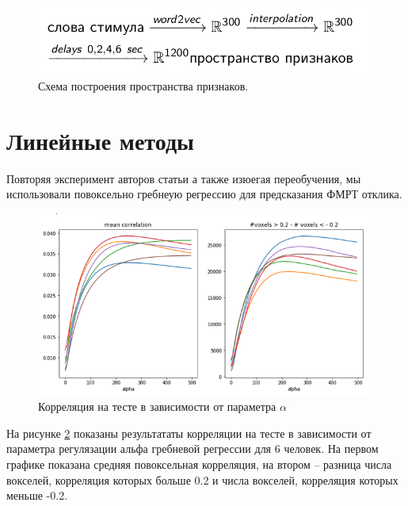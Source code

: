 \documentclass[pdftex,ptm,12pt,a4paper]{report}
\theoremstyle{definition}
\begin{document}
\begin{figure}[h]
\includegraphics[scale=0.4]{images/schema.png}
\centering
\caption{Схема построения пространства признаков.}
\label{schema}
\end{figure}

\section{Линейные методы}

Повторяя эксперимент авторов статьи \citep{huth2016natural} а также изюегая переобучения, мы использовали повоксельно гребнеую регрессию для предсказания ФМРТ отклика.

\begin{figure}[h]
\includegraphics[scale=0.5]{graphics/correlations2.png}
\centering
\caption{Корреляция на тесте в зависимости от параметра $\alpha$ }
\label{corr_many}
\end{figure}

На рисунке \ref{corr_many} показаны результататы корреляции на тесте в зависимости от параметра регулязации альфа гребневой регрессии для 6 человек. На первом графике показана средняя повоксельная корреляция, на втором -- разница числа вокселей, корреляция которых больше 0.2 и числа вокселей, корреляция которых меньше -0.2.
\end{document}
